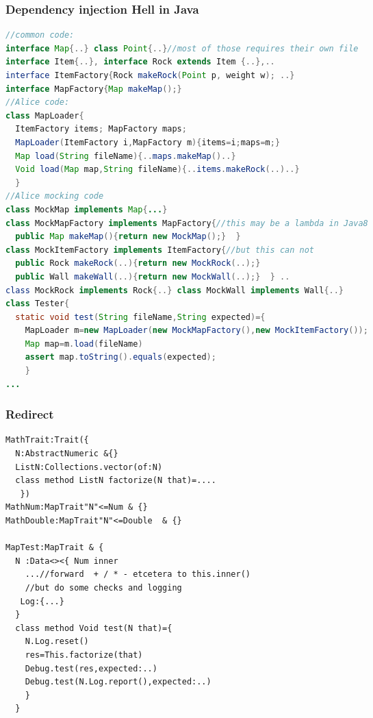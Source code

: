\begin{frame}[fragile]
\frametitle{Dependency injection Hell in Java}
\begin{NiceCode}{59ex}{0.7}
\begin{lstlisting}[language=Java, morekeywords={assert}]
//common code:
interface Map{..} class Point{..}//most of those requires their own file
interface Item{..}, interface Rock extends Item {..},..
interface ItemFactory{Rock makeRock(Point p, weight w); ..}
interface MapFactory{Map makeMap();}
//Alice code:
class MapLoader{
  ItemFactory items; MapFactory maps;
  MapLoader(ItemFactory i,MapFactory m){items=i;maps=m;}
  Map load(String fileName){..maps.makeMap()..}
  Void load(Map map,String fileName){..items.makeRock(..)..}
  }
//Alice mocking code
class MockMap implements Map{...}
class MockMapFactory implements MapFactory{//this may be a lambda in Java8
  public Map makeMap(){return new MockMap();}  }
class MockItemFactory implements ItemFactory{//but this can not
  public Rock makeRock(..){return new MockRock(..);}
  public Wall makeWall(..){return new MockWall(..);}  } ..
class MockRock implements Rock{..} class MockWall implements Wall{..}
class Tester{
  static void test(String fileName,String expected)={
    MapLoader m=new MapLoader(new MockMapFactory(),new MockItemFactory());
    Map map=m.load(fileName)
    assert map.toString().equals(expected);
    }
...
\end{lstlisting}
\end{NiceCode}
\end{frame}


\begin{frame}[fragile]
\frametitle{Redirect}
\begin{NiceCode}{59ex}{0.7}
\begin{lstlisting}
MathTrait:Trait({
  N:AbstractNumeric &{}
  ListN:Collections.vector(of:N)
  class method ListN factorize(N that)=....
   })
MathNum:MapTrait"N"<=Num & {}
MathDouble:MapTrait"N"<=Double  & {}

MapTest:MapTrait & {
  N :Data<><{ Num inner
    ...//forward  + / * - etcetera to this.inner()
    //but do some checks and logging
   Log:{...} 
  }
  class method Void test(N that)={
    N.Log.reset()
    res=This.factorize(that)
    Debug.test(res,expected:..)
    Debug.test(N.Log.report(),expected:..)
    }
  }
\end{lstlisting}
\end{NiceCode}
\end{frame}


%


